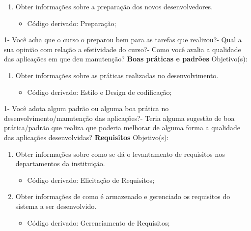 \begin{anexosenv}
\begin{enumerate}
\item Obter informações sobre a preparação dos novos desenvolvedores.
\begin{itemize}
\item Código derivado: Preparação;
\end{itemize}
\end{enumerate}
    1- Você acha que o curso o preparou bem para as tarefas que realizou?- Qual a sua opinião com relação a efetividade do curso?- Como você avalia a qualidade das aplicações em que deu manutenção?\newline
\newline
\textbf{Boas práticas e padrões}\newline\newline
Objetivo(s):
\begin{enumerate}
\item Obter informações sobre as práticas realizadas no desenvolvimento.
\begin{itemize}
\item Código derivado: Estilo e Design de codificação;
\end{itemize}
\end{enumerate}
	1- Você adota algum padrão ou alguma boa prática no desenvolvimento/manutenção das aplicações?- Teria alguma sugestão de boa prática/padrão que realiza que poderia melhorar de alguma forma a qualidade das aplicações desenvolvidas?\newline
    \newline
\textbf{Requisitos}\newline\newline
Objetivo(s):
\begin{enumerate}
\item Obter informações sobre como se dá o levantamento de requisitos nos departamentos da instituição.
\begin{itemize}
\item Código derivado: Elicitação de Requisitos;
\end{itemize}
\item Obter informações de como é armazenado e gerenciado os requisitos do sistema a ser desenvolvido.
\begin{itemize}
\item Código derivado: Gerenciamento de Requisitos;
\end{itemize}

\end{enumerate}
\end{anexosenv}
